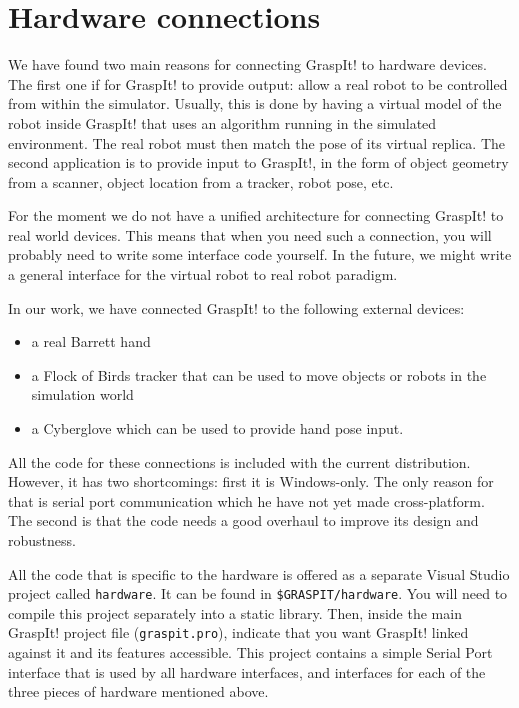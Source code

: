 \section{Hardware connections}

We have found two main reasons for connecting GraspIt! to hardware
devices. The first one if for GraspIt! to provide output: allow a real
robot to be controlled from within the simulator. Usually, this is
done by having a virtual model of the robot inside GraspIt! that uses
an algorithm running in the simulated environment. The real robot
must then match the pose of its virtual replica. The second
application is to provide input to GraspIt!, in the form of object
geometry from a scanner, object location from a tracker, robot pose,
etc.

For the moment we do not have a unified architecture for connecting
GraspIt! to real world devices. This means that when you need such a
connection, you will probably need to write some interface code
yourself. In the future, we might write a general interface for the
virtual robot to real robot paradigm.

In our work, we have connected GraspIt! to the following external devices:
\begin{itemize}
\item a real Barrett hand
\item a Flock of Birds tracker that can be used to move objects or
  robots in the simulation world
\item a Cyberglove which can be used to provide hand pose input.
\end{itemize}

All the code for these connections is included with the current
distribution. However, it has two shortcomings: first it is
Windows-only. The only reason for that is serial port communication
which he have not yet made cross-platform. The second is that the code
needs a good overhaul to improve its design and robustness.

All the code that is specific to the hardware is offered as a separate
Visual Studio project called \texttt{hardware}. It can be found in
\texttt{\$GRASPIT/hardware}. You will need to compile this project
separately into a static library. Then, inside the main GraspIt!
project file (\texttt{graspit.pro}), indicate that you want GraspIt!
linked against it and its features accessible. This project contains a
simple Serial Port interface that is used by all hardware interfaces,
and interfaces for each of the three pieces of hardware mentioned
above.

